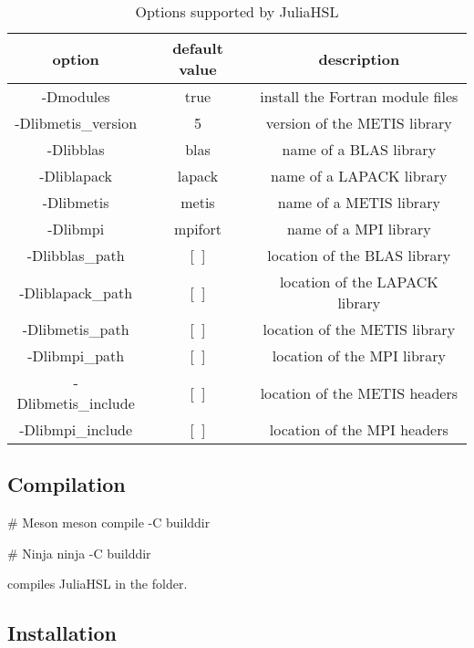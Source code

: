 \documentclass[gdweb]{geradwp}
\begin{document}
\begin{table}[ht]
  \label{tab:options}
  \centering
  \begin{tabular}{|c|c|c|}
    \hline
    option              & default value & description                      \\ \hline
    -Dmodules           & true          & install the Fortran module files \\ \hline
    -Dlibmetis\_version & 5             & version of the METIS library     \\ \hline
    -Dlibblas           & blas          & name of a BLAS library           \\ \hline
    -Dliblapack         & lapack        & name of a LAPACK library         \\ \hline
    -Dlibmetis          & metis         & name of a METIS library          \\ \hline
    -Dlibmpi            & mpifort       & name of a MPI library            \\ \hline
    -Dlibblas\_path     & [~]           & location of the BLAS library     \\ \hline
    -Dliblapack\_path   & [~]           & location of the LAPACK library   \\ \hline
    -Dlibmetis\_path    & [~]           & location of the METIS library    \\ \hline
    -Dlibmpi\_path      & [~]           & location of the MPI library      \\ \hline
    -Dlibmetis\_include & [~]           & location of the METIS headers    \\ \hline
    -Dlibmpi\_include   & [~]           & location of the MPI headers      \\ \hline
  \end{tabular}
  \caption{Options supported by JuliaHSL}
\end{table}

\subsection{Compilation}

\begin{jllisting}
# Meson
meson compile -C builddir

# Ninja
ninja -C builddir
\end{jllisting}
compiles JuliaHSL in the  folder.

\subsection{Installation}
\end{document}
